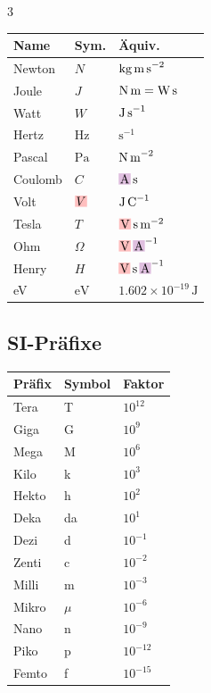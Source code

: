 \documentclass[10pt,a4paper]{article}
\newcommand{\icc}[1]{{\setlength\fboxsep{1pt}\colorbox{violet!25}{\ensuremath{#1}}}}
\newcommand{\vc}[1]{{\setlength\fboxsep{1pt}\colorbox{red!25}{\ensuremath{#1}}}}
\begin{document}
\begin{multicols}{3}
{\footnotesize\renewcommand{\arraystretch}{1.3}
\begin{tabularx}{\linewidth}{|X|l|X|}
\hline
\textbf{Name} & \textbf{Sym.} & \textbf{Äquiv.} \\
\hline
Newton  & $N$            & $\text{kg\,m\,s}^{-2}$ \\
Joule   & $J$            & $\text{N\,m}=\text{W\,s}$ \\
Watt    & $W$            & $\text{J\,s}^{-1}$ \\
Hertz   & $\text{Hz}$    & $\text{s}^{-1}$ \\
Pascal  & $\text{Pa}$    & $\text{N\,m}^{-2}$ \\
\hline
Coulomb & $C$            & $\icc{\text{A}}\,\text{s}$ \\
Volt    & $\vc{V}$            & $\text{J\,C}^{-1}$ \\
Tesla   & $T$            & $\vc{\text{V}}\,\text{s\,m}^{-2}$ \\
Ohm     & $\Omega$       & $\vc{\text{V}}\,\icc{\text{A}}^{-1}$ \\
Henry   & $H$            & $\vc{\text{V}}\,\text{s}\,\icc{\text{A}}^{-1}$ \\
\hline
eV      & $\text{eV}$    & $1.602\times10^{-19}\,\text{J}$ \\
\hline
\end{tabularx}}

\subsection*{SI-Präfixe}

{\footnotesize\renewcommand{\arraystretch}{1.2}
\begin{tabularx}{\linewidth}{|X|l|l|}
\hline
\textbf{Präfix} & \textbf{Symbol} & \textbf{Faktor} \\
\hline
Tera  & T & $10^{12}$ \\
Giga  & G & $10^{9}$  \\
Mega  & M & $10^{6}$  \\
Kilo  & k & $10^{3}$  \\
Hekto & h & $10^{2}$  \\
Deka  & da & $10^{1}$ \\
Dezi  & d & $10^{-1}$ \\
Zenti & c & $10^{-2}$ \\
Milli & m & $10^{-3}$ \\
Mikro & $\mu$ & $10^{-6}$ \\
Nano  & n & $10^{-9}$ \\
Piko  & p & $10^{-12}$ \\
Femto & f & $10^{-15}$ \\
\hline
\end{tabularx}}

\end{multicols}
\end{document}
